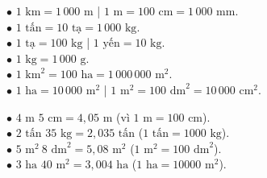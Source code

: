 \documentclass[14pt,a4paper,oneside]{extbook}
\begin{document}
\noindent
\begin{minipage}[t]{0.52\textwidth}
  \begin{tcolorbox}[
    enhanced,
    title={\footnotesize\bfseries\color{white}\faStar\ 2. Các mốc quy đổi cần thuộc lòng},
    colback=teal!2!white,
    colframe=teal!75!black,
    arc=2.5mm, boxrule=0.8pt, top=1.8mm, bottom=1.8mm, left=2.2mm, right=2.2mm
  ]
    \footnotesize
    $\bullet$ $1\text{ km} = 1\,000\text{ m}$ \quad | \quad $1\text{ m} = 100\text{ cm} = 1\,000\text{ mm}$.\\
    $\bullet$ $1\text{ tấn} = 10\text{ tạ} = 1\,000\text{ kg}$.\\
    $\bullet$ $1\text{ tạ} = 100\text{ kg}$ \quad | \quad $1\text{ yến} = 10\text{ kg}$.\\
    $\bullet$ $1\text{ kg} = 1\,000\text{ g}$.\\
    $\bullet$ $1\text{ km}^2 = 100\text{ ha} = 1\,000\,000\text{ m}^2$.\\
    $\bullet$ $1\text{ ha} = 10\,000\text{ m}^2$ \quad | \quad $1\text{ m}^2 = 100\text{ dm}^2 = 10\,000\text{ cm}^2$.
  \end{tcolorbox}
\end{minipage}%
\hfill
\begin{minipage}[t]{0.46\textwidth}
  \begin{tcolorbox}[
    enhanced,
    title={\footnotesize\bfseries\color{white}\faBolt\ 3. Đổi số đo 2 đơn vị sang STP},
    colback=purple!2!white,
    colframe=purple!70!black,
    arc=2.5mm, boxrule=0.8pt, top=1.8mm, bottom=1.8mm, left=2mm, right=2mm
  ]
    \footnotesize
    $\bullet$ $4\text{ m } 5\text{ cm} = 4,05\text{ m}$ (vì $1\text{ m} = 100\text{ cm}$).\\
    $\bullet$ $2\text{ tấn } 35\text{ kg} = 2,035\text{ tấn}$ ($1\text{ tấn} = 1000\text{ kg}$).\\
    $\bullet$ $5\text{ m}^2\ 8\text{ dm}^2 = 5,08\text{ m}^2$ ($1\text{ m}^2 = 100\text{ dm}^2$).\\
    $\bullet$ $3\text{ ha } 40\text{ m}^2 = 3,004\text{ ha}$ ($1\text{ ha} = 10000\text{ m}^2$).
  \end{tcolorbox}
\end{minipage}

\vspace{3mm}
\end{document}
